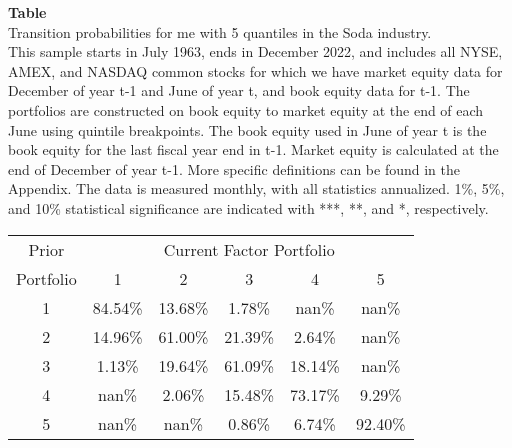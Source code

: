 \begin{table*}[ht!]
\raggedright
{}
\label{tab: transition_probs_me_Soda_with_5_quantiles}
\textbf{Table \thetable} \\
Transition probabilities for me with 5 quantiles in the Soda industry. \\
\hspace*{1em}This sample starts in July 1963, ends in December 2022, and includes all NYSE, AMEX, and NASDAQ common stocks for which we have market equity data for December of year t-1 and June of year t, and book equity data for t-1. The portfolios are constructed on book equity to market equity at the end of each June using quintile breakpoints.  The book equity used in June of year t is the book equity for the last fiscal year end in t-1.  Market equity is calculated at the end of December of year t-1.  More specific definitions can be found in the Appendix.  The data is measured monthly, with all statistics annualized.  1\%, 5\%, and 10\% statistical significance are indicated with ***, **, and *, respectively. \\
\vspace{0.5em}
\centering
\begin{adjustbox}{max width=\textwidth}
\begin{tabular}{@{}cccccc@{}}
\toprule
Prior & \multicolumn{5}{c}{Current Factor Portfolio} \\
Portfolio & 1 & 2 & 3 & 4 & 5 \\
\midrule
1 & 84.54\% & 13.68\% & 1.78\% & nan\% & nan\% \\
2 & 14.96\% & 61.00\% & 21.39\% & 2.64\% & nan\% \\
3 & 1.13\% & 19.64\% & 61.09\% & 18.14\% & nan\% \\
4 & nan\% & 2.06\% & 15.48\% & 73.17\% & 9.29\% \\
5 & nan\% & nan\% & 0.86\% & 6.74\% & 92.40\% \\
\bottomrule
\end{tabular}
\end{adjustbox}
\end{table*}